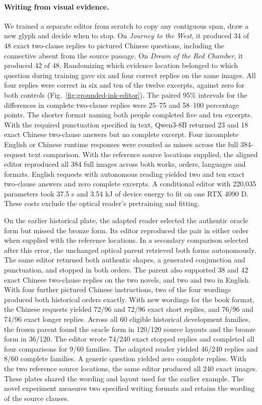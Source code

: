 \documentclass[12pt,a4paper]{article}
\providecommand{\DIFadd}[1]{{\protect\color{blue} \sf #1}} %
\begin{document}
\paragraph{\DIFadd{Writing from visual evidence.}}
\DIFadd{We trained a separate editor from scratch to copy any contiguous span, draw a new glyph and decide when to stop. On \textit{Journey to the West}, it produced 34 of 48 exact two-clause replies to pictured Chinese questions, including the connective absent from the source passage. On \textit{Dream of the Red Chamber}, it produced 42 of 48. Randomizing which evidence location belonged to which question during training gave six and four correct replies on the same images. All four replies were correct in six and ten of the twelve excerpts, against zero for both controls (Fig.~\ref{fig:grounded-ink-editor}). The paired 95\% intervals for the differences in complete two-clause replies were 25--75 and 58--100 percentage points. The shorter format naming both people completed five and ten excerpts. With the required punctuation specified in text, Qwen3-8B returned 23 and 18 exact Chinese two-clause answers but no complete excerpt. Four incomplete English or Chinese runtime responses were counted as misses across the full 384-request text comparison. With the reference source locations supplied, the aligned editor reproduced all 384 full images across both works, orders, languages and formats. English requests with autonomous reading yielded two and ten exact two-clause answers and zero complete excerpts. A conditional editor with 220,035 parameters took 37.5 s and 3.54 kJ of device energy to fit on one RTX 4090 D. These costs exclude the optical reader's pretraining and fitting.
}

\DIFadd{On the earlier historical plate, the adapted reader selected the authentic oracle form but missed the bronze form. Its editor reproduced the pair in either order when supplied with the reference locations. In a secondary comparison selected after this error, the unchanged optical parent retrieved both forms autonomously. The same editor returned both authentic shapes, a generated conjunction and punctuation, and stopped in both orders. The parent also supported 38 and 42 exact Chinese two-clause replies on the two novels, and two and two in English. With four further pictured Chinese instructions, two of the four wordings produced both historical orders exactly. With new wordings for the book format, the Chinese requests yielded 72/96 and 72/96 exact short replies, and 76/96 and 74/96 exact longer replies. Across all 60 eligible historical development families, the frozen parent found the oracle form in 120/120 source layouts and the bronze form in 36/120. The editor wrote 74/240 exact stopped replies and completed all four comparisons for 9/60 families. The adapted reader yielded 46/240 replies and 8/60 complete families. A generic question yielded zero complete replies. With the two reference source locations, the same editor produced all 240 exact images. These plates shared the wording and layout used for the earlier example. The novel experiment measures two specified writing formats and retains the wording of the source clauses.
}
\end{document}
